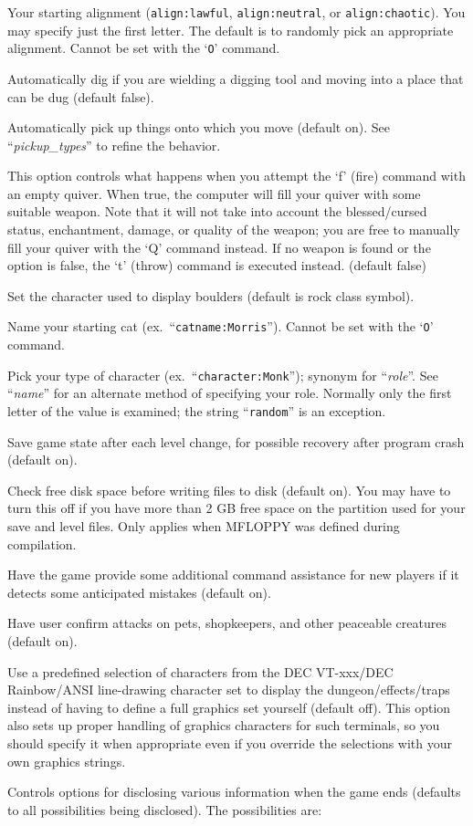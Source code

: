 \blist{}
\item[\ib{align}]
Your starting alignment ({\tt align:lawful}, {\tt align:neutral},
or {\tt align:chaotic}).  You may specify just the first letter.
The default is to randomly pick an appropriate alignment.
Cannot be set with the `{\tt O}' command.
\item[\ib{autodig}]
Automatically dig if you are wielding a digging tool and moving into a place
that can be dug (default false).
\item[\ib{autopickup}]
Automatically pick up things onto which you move (default on).
See ``{\it pickup\_types\/}'' to refine the behavior.
\item[\ib{autoquiver}]
This option controls what happens when you attempt the `f' (fire)
command with an empty quiver.  When true, the computer will fill
your quiver with some suitable weapon.  Note that it will not take
into account the blessed/cursed status, enchantment, damage, or
quality of the weapon; you are free to manually fill your quiver with
the `Q' command instead.  If no weapon is found or the option is
false, the `t' (throw) command is executed instead.  (default false)
\item[\ib{boulder}]
Set the character used to display boulders (default is rock class symbol).
\item[\ib{catname}]
Name your starting cat (ex.\ ``{\tt catname:Morris}'').
Cannot be set with the `{\tt O}' command.
\item[\ib{character}]
Pick your type of character (ex.\ ``{\tt character:Monk}'');
synonym for ``{\it role\/}''.  See ``{\it name\/}'' for an alternate method
of specifying your role.  Normally only the first letter of
the value is examined; the string ``{\tt random}'' is an exception.
\item[\ib{checkpoint}]
Save game state after each level change, for possible recovery after
program crash (default on).
\item[\ib{checkspace}]
Check free disk space before writing files to disk (default on).
You may have to turn this off if you have more than 2 GB free space
on the partition used for your save and level files.
Only applies when MFLOPPY was defined during compilation.
\item[\ib{cmdassist}]
Have the game provide some additional command assistance for new 
players if it detects some anticipated mistakes (default on).
\item[\ib{confirm}]
Have user confirm attacks on pets, shopkeepers, and other
peaceable creatures (default on).
\item[\ib{DECgraphics}]
Use a predefined selection of characters from the DEC VT-xxx/DEC
Rainbow/ANSI line-drawing character set to display the dungeon/effects/traps
instead of having to define a full graphics set yourself (default off).
This option also sets up proper handling of graphics
characters for such terminals, so you should specify it when appropriate
even if you override the selections with your own graphics strings.
\item[\ib{disclose}]
Controls options for disclosing various information when the game ends (defaults
to all possibilities being disclosed).
The possibilities are:


